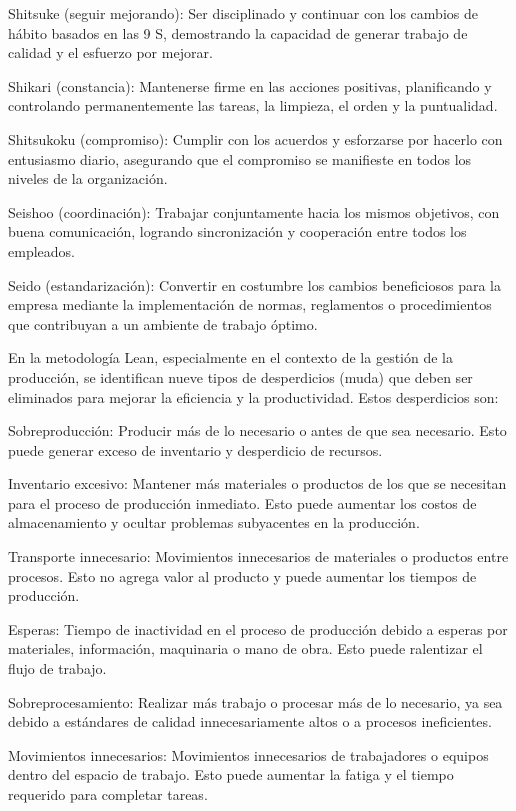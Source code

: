     Shitsuke (seguir mejorando): Ser disciplinado y continuar con los cambios de hábito basados en las 9 S, demostrando la capacidad de generar trabajo de calidad y el esfuerzo por mejorar.
    
    Shikari (constancia): Mantenerse firme en las acciones positivas, planificando y controlando permanentemente las tareas, la limpieza, el orden y la puntualidad.
    
    Shitsukoku (compromiso): Cumplir con los acuerdos y esforzarse por hacerlo con entusiasmo diario, asegurando que el compromiso se manifieste en todos los niveles de la organización.
    
    Seishoo (coordinación): Trabajar conjuntamente hacia los mismos objetivos, con buena comunicación, logrando sincronización y cooperación entre todos los empleados.
    
    Seido (estandarización): Convertir en costumbre los cambios beneficiosos para la empresa mediante la implementación de normas, reglamentos o procedimientos que contribuyan a un ambiente de trabajo óptimo.
    
    
    En la metodología Lean, especialmente en el contexto de la gestión de la producción, se identifican nueve tipos de desperdicios (muda) que deben ser eliminados para mejorar la eficiencia y la productividad. Estos desperdicios son:
    
    Sobreproducción: Producir más de lo necesario o antes de que sea necesario. Esto puede generar exceso de inventario y desperdicio de recursos.
    
    Inventario excesivo: Mantener más materiales o productos de los que se necesitan para el proceso de producción inmediato. Esto puede aumentar los costos de almacenamiento y ocultar problemas subyacentes en la producción.
    
    Transporte innecesario: Movimientos innecesarios de materiales o productos entre procesos. Esto no agrega valor al producto y puede aumentar los tiempos de producción.
    
    Esperas: Tiempo de inactividad en el proceso de producción debido a esperas por materiales, información, maquinaria o mano de obra. Esto puede ralentizar el flujo de trabajo.
    
    Sobreprocesamiento: Realizar más trabajo o procesar más de lo necesario, ya sea debido a estándares de calidad innecesariamente altos o a procesos ineficientes.
    
    Movimientos innecesarios: Movimientos innecesarios de trabajadores o equipos dentro del espacio de trabajo. Esto puede aumentar la fatiga y el tiempo requerido para completar tareas.
    
